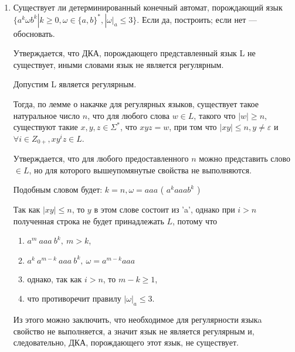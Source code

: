 \documentclass[12pt]{article}
\begin{document}
\bigskip
\begin{enumerate}

\item Существует ли детерминированный конечный автомат, порождающий язык
    $\{ a^k \omega b^k | k \geq 0, \omega \in \{a, b\}^{*}, |\omega|_a \leq 3\}$.
Если да, построить; если нет — обосновать.

Утверждается, что ДКА, порождающего представленный язык L не существует, иными словами язык не является регулярным.

Допустим L является регулярным.

Тогда, по лемме о накачке для регулярных языков, существует такое натуральное число $n$,
что для любого слова $w \in L$, такого что $|w| \geq n$, существуют такие $x, y, z \in \Sigma^*$,
что $xyz=w$, при том что $|xy| \leq n, y \neq \varepsilon$ и $\forall i \in Z_{0+}, xy^iz \in L$.

Утверждается, что для любого предоставленного $n$ можно представить слово $\in L$, но для которого вышеупомянутые свойства не выполняются.

Подобным словом будет: $k=n, \omega = aaa$ ( $a^kaaab^k$ )

Так как $|xy| \leq n$, то $y$ в этом слове состоит из 'a', однако при $i>n$ полученная строка не будет принадлежать $L$, потому что
\begin{enumerate}
        \item $ a^m~aaa~b^k,~m > k $, 
        \item $a^k~a^{m-k}~aaa~b^k,~ \omega= a^{m-k}aaa$
        \item однако, так как $i>n$, то $m - k \geq 1 $,
        \item что противоречит правилу $|\omega|_a \leq 3$.
\end{enumerate}

Из этого можно заключить, что необходимое для регулярности языкa свойство не выполняется, а значит язык не является регулярным
и, следовательно, ДКА, порождающего этот язык, не существует.

\end{enumerate}
\end{document}
